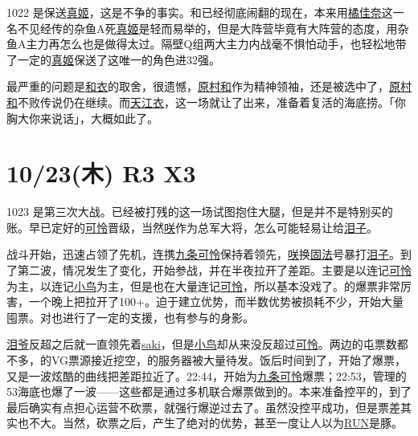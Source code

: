 1022 是保送\uline{真姬}，这是不争的事实。和已经彻底闹翻的现在，本来用\uline{橘佳奈}这一名不见经传的杂鱼A死\uline{真姬}是轻而易举的，但是大阵营毕竟有大阵营的态度，用杂鱼A主力再怎么也是做得太过。隔壁Q组两大主力内战毫不惧怕动手，也轻松地带了一定的\uline{真姬}保送了这唯一的角色进32强。

最严重的问题是\uline{和}\uline{衣}的取舍，很遗憾，\uline{原村和}作为精神领袖，还是被选中了，\uline{原村和}不败传说仍在继续。而\uline{天江衣}，这一场就让了出来，准备着复活的海底捞。「你胸大你来说话」，大概如此了。

\section{10/23(木) R3 X3}


1023 是第三次大战。已经被打残的这一场试图抱住大腿，但是并不是特别买的账。早已定好的\uline{可怜}晋级，当然\uline{咲}作为总军大将，怎么可能轻易让给\uline{泪子}。

战斗开始，迅速占领了先机，连携\uline{九条可怜}保持着领先，\uline{咲}换\uline{固法}号暴打\uline{泪子}。到了第二波，情况发生了变化，开始参战，并在半夜拉开了差距。主要是以连记\uline{可怜}为主，以连记\uline{小鸟}为主，但是也在大量连记\uline{可怜}，所以基本没戏了。的爆票非常厉害，一个晚上把拉开了100+。迫于建立优势，而半数优势被损耗不少，开始大量囤票。对也进行了一定的支援，也有参与的身影。

\uline{泪爷}反超之后就一直领先着\uline{saki}，但是\uline{小鸟}却从来没反超过\uline{可怜}。两边的屯票数都不多，的VG票源接近挖空，的服务器被大量待发。饭后时间到了，开始了爆票，又是一波炫酷的曲线把差距拉近了。22:44，开始为\uline{九条可怜}爆票；22:53，管理的53海底也爆了一波——这些都是通过多机联合爆票做到的。本来准备控平的，到了最后确实有点担心运营不砍票，就强行爆逆过去了。虽然没控平成功，但是票差其实也不大。当然，砍票之后，产生了绝对的优势，甚至一度让人以为\uline{RUN}是豚。


